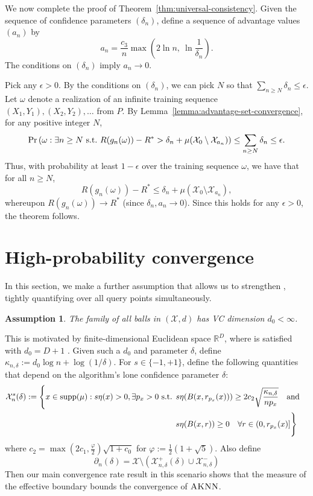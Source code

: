 \documentclass{article}
\def\pr{{\rm Pr}}
\def\X{{\mathcal X}}
\def\supp{{\rm supp}}
\newcommand{\algname}{\textsc{AKNN}}
\newtheorem{assump}{Assumption}
\begin{document}
We now complete the proof of Theorem~\ref{thm:universal-consistency}. Given the sequence of confidence parameters $(\delta_n)$, define a sequence of advantage values $(a_n)$ by
$$ a_n = \frac{c_3}{n} \max \left( 2 \ln n, \ \ln \frac{1}{\delta_n} \right) .$$
The conditions on $(\delta_n)$ imply $a_n \rightarrow 0$.

Pick any $\epsilon > 0$. By the conditions on $(\delta_n)$, we can pick $N$ so that $\sum_{n \geq N} \delta_n \leq \epsilon$. Let $\omega$ denote a realization of an infinite training sequence $(X_1, Y_1), (X_2, Y_2), \ldots$ from $P$. By Lemma~\ref{lemma:advantage-set-convergence}, for any positive integer $N$,
$$ \pr \left(\omega: \exists n \geq N \mbox{\ s.t.\ } R(g_n(\omega)) - R^* > \delta_n + \mu(\X_0 \setminus \X_{a_n}) \right) \leq \sum_{n \geq N} \delta_n \leq \epsilon.$$
Thus, with probability at least $1-\epsilon$ over the training sequence $\omega$, we have that for all $n \geq N$,
$$ R(g_n(\omega)) - R^* \leq \delta_n + \mu(\X_0 \setminus \X_{a_n}) ,$$
whereupon $R(g_n(\omega)) \rightarrow R^*$ (since $\delta_n, a_n \rightarrow 0$). Since this holds for any $\epsilon  >0$, the theorem follows.

\section{High-probability convergence}

In this section, we make a further assumption that allows us to strengthen , tightly quantifying over all query points simultaneously. 
\begin{assump}
\label{assump:VCallballs}
The family of all balls in $(\X, d)$ has VC dimension $d_0 < \infty$.
\end{assump}
This is motivated by finite-dimensional Euclidean space $\mathbb{R}^{D}$, where  is satisfied with $d_0 = D+1$ \citep{dudley79}. Given such a $d_0$ and parameter $\delta$, define $\kappa_{n, \delta} := d_0 \log n + \log (1/\delta)$. 
For $s \in \{ -1, +1 \}$, define the following quantities that depend on the algorithm's lone confidence parameter $\delta$:
\begin{align*}
\X^{s}_n (\delta)
:= \Bigg\{
x \in \supp(\mu) : s \eta(x) > 0 , \exists p_x > 0 \text{ s.t. } 
&s \eta(B(x,r_{p_x}(x))) \geq 2 c_2 \sqrt{\frac{ \kappa_{n, \delta} }{n p_x}}
\quad\text{and}\quad \\
&s \eta(B(x,r)) \geq 0 \quad\forall r \in (0, r_{p_x}(x)]
\Bigg\}
\end{align*}
where $c_2 = \max(2c_1, \frac{\varphi}{2} ) \sqrt{1 + c_0}$ for $\varphi := \frac{1}{2} (1 + \sqrt{5})$.
Also define 
$$ \partial_n (\delta) = \X \setminus (\X^+_{n,\delta} (\delta) \cup \X^-_{n,\delta}) $$
Then our main convergence rate result in this scenario shows that the measure of the effective boundary bounds the convergence of $\algname$.
\end{document}
